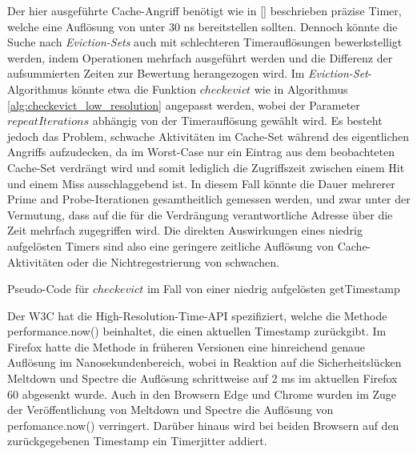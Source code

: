 Der hier ausgeführte Cache-Angriff benötigt wie in \ref{}  beschrieben präzise Timer, welche eine Auflösung von unter 30 ns bereitstellen sollten. Dennoch könnte die Suche nach \textit{Eviction-Sets} auch mit schlechteren Timerauflösungen bewerkstelligt werden, indem Operationen mehrfach ausgeführt werden und die Differenz der aufsummierten Zeiten zur Bewertung herangezogen wird.
Im \textit{Eviction-Set}-Algorithmus könnte etwa die Funktion $checkevict$ wie in Algorithmus \ref{alg:checkevict_low_resolution} angepasst werden, wobei der Parameter $repeatIterations$ abhängig von der Timerauflösung gewählt wird. 
Es besteht jedoch das Problem, schwache Aktivitäten im Cache-Set während des eigentlichen Angriffs aufzudecken, da im Worst-Case nur ein Eintrag aus dem beobachteten Cache-Set verdrängt wird und somit lediglich die Zugriffszeit zwischen einem Hit und einem Miss ausschlaggebend ist. 
In diesem Fall könnte die Dauer mehrerer Prime and Probe-Iterationen gesamtheitlich gemessen werden, und zwar unter der Vermutung, dass auf die für die Verdrängung verantwortliche Adresse über die Zeit mehrfach zugegriffen wird. 
Die direkten Auswirkungen eines niedrig aufgelösten Timers sind also eine geringere zeitliche Auflösung von Cache-Aktivitäten oder die Nichtregestrierung von schwachen.

\begin{algorithm}[h]
\DontPrintSemicolon
\caption{Pseudo-Code für $checkevict$ im Fall von einer niedrig aufgelösten getTimestamp}
\label{alg:checkevict_low_resolution}


\end{algorithm}

Der W3C hat die High-Resolution-Time-API spezifiziert, welche die Methode performance.now() beinhaltet, die einen aktuellen Timestamp zurückgibt. Im Firefox hatte die Methode in früheren Versionen eine hinreichend genaue Auflösung im Nanosekundenbereich, wobei in Reaktion auf die Sicherheitslücken Meltdown und Spectre die Auflösung schrittweise auf 2 ms im aktuellen Firefox 60 abgesenkt wurde. 
Auch in den Browsern Edge und Chrome wurden im Zuge der Veröffentlichung von Meltdown und Spectre die Auflösung von perfomance.now() verringert.
Darüber hinaus wird bei beiden Browsern auf den zurückgegebenen Timestamp ein Timerjitter addiert.


